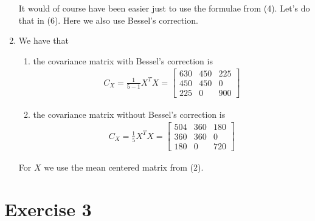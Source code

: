 \documentclass{article}
\begin{document}
\begin{enumerate}
	It would of course have been easier just to use the formulae from (4). Let's do that in (6). Here we also use Bessel's correction.
	
	\item We have that
	\begin{enumerate}[label = \alph*)]
		\item the covariance matrix with Bessel's correction is 
		\begin{align*}
			C_X = \frac{1}{5-1}X^TX = 
			\begin{bmatrix}
				630 & 450 & 225 \\
				450 & 450 & 0 \\
				225 & 0 & 900			
			\end{bmatrix}
		\end{align*}
		\item the covariance matrix without Bessel's correction is 
		\begin{align*}
		C_X = \frac{1}{5}X^TX = 
			\begin{bmatrix}
				504 & 360 & 180 \\
				360 & 360 & 0 \\
				180 & 0 & 720			
			\end{bmatrix}
		\end{align*}
	\end{enumerate}
	
	For $X$ we use the mean centered matrix from (2).
	
\end{enumerate}

\section*{Exercise 3}
\end{document}
